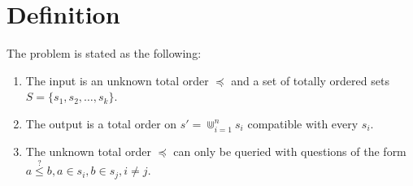 \section{Definition}
\label{tree:merging:def}

The problem is stated as the following:

\begin{enumerate}
\item The input is an unknown total order $\preceq$ and a set of totally ordered sets $S = \{s_1, s_2, \dots, s_k\}$.
\item The output is a total order on $s' = \Cup_{i=1}^{n} s_i$ compatible with every $s_i$.
\item The unknown total order $\preceq$ can only be queried with questions of the form $a \stackrel{?}{\le} b, a \in s_i, b \in s_j, i \neq j$.
\end{enumerate}

